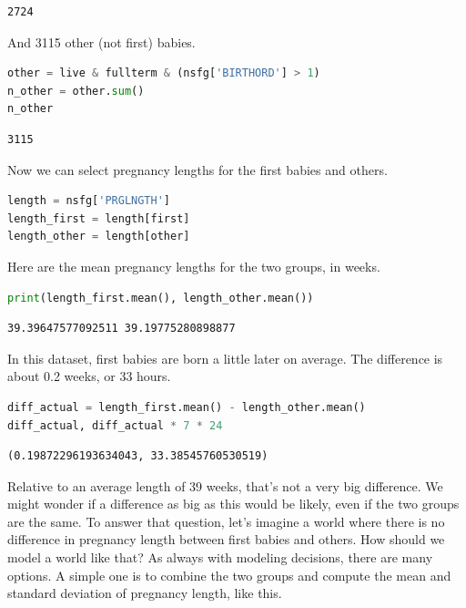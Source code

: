 \begin{lstlisting}[style=output]
2724
\end{lstlisting}

And 3115 other (not first) babies.

\begin{lstlisting}[language=Python,style=source]
other = live & fullterm & (nsfg['BIRTHORD'] > 1)
n_other = other.sum()
n_other
\end{lstlisting}

\begin{lstlisting}[style=output]
3115
\end{lstlisting}

Now we can select pregnancy lengths for the first babies and others.

\begin{lstlisting}[language=Python,style=source]
length = nsfg['PRGLNGTH']
length_first = length[first]
length_other = length[other]
\end{lstlisting}

Here are the mean pregnancy lengths for the two groups, in weeks.

\begin{lstlisting}[language=Python,style=source]
print(length_first.mean(), length_other.mean())
\end{lstlisting}

\begin{lstlisting}[style=output]
39.39647577092511 39.19775280898877
\end{lstlisting}

In this dataset, first babies are born a little later on average. The
difference is about 0.2 weeks, or 33 hours.

\begin{lstlisting}[language=Python,style=source]
diff_actual = length_first.mean() - length_other.mean()
diff_actual, diff_actual * 7 * 24
\end{lstlisting}

\begin{lstlisting}[style=output]
(0.19872296193634043, 33.38545760530519)
\end{lstlisting}

Relative to an average length of 39 weeks, that's not a very big
difference. We might wonder if a difference as big as this would be
likely, even if the two groups are the same. To answer that question,
let's imagine a world where there is no difference in pregnancy length
between first babies and others. How should we model a world like that?
As always with modeling decisions, there are many options. A simple one
is to combine the two groups and compute the mean and standard deviation
of pregnancy length, like this.

